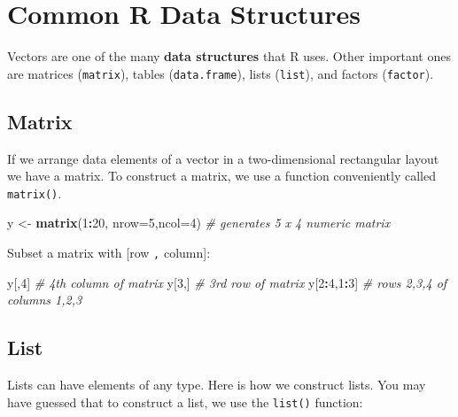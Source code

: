 \documentclass[]{book}
\newenvironment{Shaded}{\begin{snugshade}}{\end{snugshade}}
\newcommand{\KeywordTok}[1]{\textcolor[rgb]{0.13,0.29,0.53}{\textbf{#1}}}
\newcommand{\DataTypeTok}[1]{\textcolor[rgb]{0.13,0.29,0.53}{#1}}
\newcommand{\DecValTok}[1]{\textcolor[rgb]{0.00,0.00,0.81}{#1}}
\newcommand{\StringTok}[1]{\textcolor[rgb]{0.31,0.60,0.02}{#1}}
\newcommand{\CommentTok}[1]{\textcolor[rgb]{0.56,0.35,0.01}{\textit{#1}}}
\newcommand{\OperatorTok}[1]{\textcolor[rgb]{0.81,0.36,0.00}{\textbf{#1}}}
\newcommand{\NormalTok}[1]{#1}
\theoremstyle{definition}
\theoremstyle{definition}
\theoremstyle{remark}
\begin{document}
\section{Common R Data Structures}\label{common-r-data-structures}

Vectors are one of the many \textbf{data structures} that R uses. Other
important ones are matrices (\texttt{matrix}), tables
(\texttt{data.frame}), lists (\texttt{list}), and factors
(\texttt{factor}).

\subsection{Matrix}\label{matrix}

If we arrange data elements of a vector in a two-dimensional rectangular
layout we have a matrix. To construct a matrix, we use a function
conveniently called \texttt{matrix()}.

\begin{Shaded}
\begin{Highlighting}[]
\NormalTok{y <-}\StringTok{ }\KeywordTok{matrix}\NormalTok{(}\DecValTok{1}\OperatorTok{:}\DecValTok{20}\NormalTok{, }\DataTypeTok{nrow=}\DecValTok{5}\NormalTok{,}\DataTypeTok{ncol=}\DecValTok{4}\NormalTok{) }\CommentTok{# generates 5 x 4 numeric matrix}
\end{Highlighting}
\end{Shaded}

Subset a matrix with {[}row \texttt{,} column{]}:

\begin{Shaded}
\begin{Highlighting}[]
\NormalTok{y[,}\DecValTok{4}\NormalTok{]       }\CommentTok{# 4th column of matrix}
\NormalTok{y[}\DecValTok{3}\NormalTok{,]       }\CommentTok{# 3rd row of matrix}
\NormalTok{y[}\DecValTok{2}\OperatorTok{:}\DecValTok{4}\NormalTok{,}\DecValTok{1}\OperatorTok{:}\DecValTok{3}\NormalTok{]  }\CommentTok{# rows 2,3,4 of columns 1,2,3}
\end{Highlighting}
\end{Shaded}

\subsection{List}\label{list}

Lists can have elements of any type. Here is how we construct lists. You
may have guessed that to construct a list, we use the \texttt{list()}
function:
\end{document}
